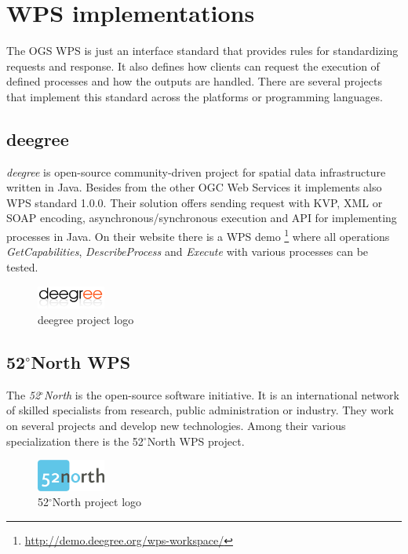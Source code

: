 \documentclass[12pt,a4paper]{article}
\begin{document}
\newpage
\section{WPS implementations}
The OGS WPS is just an interface standard that provides rules for standardizing requests and response. It also defines how clients can request the execution of defined processes and how the outputs are handled. There are several projects that implement this standard across the platforms or programming languages.

\subsection{deegree}
\textit{deegree} is open-source community-driven project for spatial data infrastructure written in Java. Besides from the other OGC Web Services it implements also WPS standard 1.0.0. Their solution offers sending request with KVP, XML or SOAP encoding, asynchronous/synchronous execution and API for implementing processes in Java. On their website there is a WPS demo
\footnote{\url{http://demo.deegree.org/wps-workspace/}} where all operations \textit{GetCapabilities}, \textit{DescribeProcess} and \textit{Execute} with various processes can be tested.

\bigskip
\begin{figure}[h!]
\centering
\includegraphics[width=0.2\textwidth]{img/deegree.png}
\caption{deegree project logo}
\label{fig:deegree}
\end{figure}

\subsection{52$^{\circ}$North WPS}
The \textit{52$^{\circ}$North} is the open-source software initiative. It is an international network of skilled specialists from research,
public administration or industry. They work on several projects and develop new technologies. Among their various specialization there is 
the 52$^{\circ}$North WPS project.

\bigskip
\begin{figure}[h!]
\centering
\includegraphics[width=0.2\textwidth]{img/Intro_52north.png}
\caption{52$^{\circ}$North project logo}
\label{fig:Intro_52north}
\end{figure}
\end{document}
